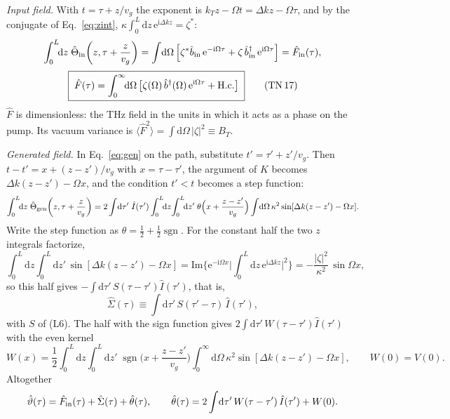 \documentclass[aps,pra,onecolumn,notitlepage,11pt,amsmath,amssymb,nofootinbib]{revtex4-2}
\newcommand{\Iop}{\hat I}
\newcommand{\dd}{\mathrm{d}}
\newcommand{\ee}{\mathrm{e}}
\newcommand{\ii}{\mathrm{i}}
\newcommand{\sgn}{\operatorname{sgn}}
\newcommand{\TN}[1]{\text{TN\,#1}}
\begin{document}
\emph{Input field.} With $t=\tau+z/v_g$ the exponent is
$k_Tz-\Omega t=\Delta kz-\Omega\tau$, and by the conjugate of
Eq.~\eqref{eq:zint}, $\kappa\int_0^L\dd z\,\ee^{\ii\Delta kz}=\zeta^*$:
\begin{equation}
\int_0^L\!\!\dd z\;\hat\Theta_{\rm in}\!\left(z,\tau+\frac{z}{v_g}\right)
=\int\!\dd\Omega\,\Big[\zeta^*\hat b_{\rm in}\,\ee^{-\ii\Omega\tau}+\zeta\,\hat b_{\rm in}^\dagger\,\ee^{\ii\Omega\tau}\Big]
=\hat F_{\rm in}(\tau),
\end{equation}
\begin{equation}
\boxed{\;\hat F(\tau)=\int_0^\infty\!\!\dd\Omega\,
\big[\zeta(\Omega)\,\hat b^\dagger(\Omega)\,\ee^{\ii\Omega\tau}+\mathrm{H.c.}\big]\;}
\tag{\TN{17}}
\end{equation}
$\hat F$ is dimensionless: the THz field in the units in which it acts as a
phase on the pump. Its vacuum variance is
$\langle\hat F^2\rangle=\int\dd\Omega\,|\zeta|^2\equiv B_T$.

\emph{Generated field.} In Eq.~\eqref{eq:gen} on the path, substitute
$t'=\tau'+z'/v_g$. Then $t-t'=x+(z-z')/v_g$ with $x=\tau-\tau'$, the argument
of $K$ becomes $\Delta k(z-z')-\Omega x$, and the condition $t'<t$ becomes a
step function:
\begin{equation}
\int_0^L\!\!\dd z\;\hat\Theta_{\rm gen}\!\left(z,\tau+\frac{z}{v_g}\right)
=2\int\!\dd\tau'\;\Iop(\tau')\int_0^L\!\!\dd z\!\int_0^L\!\!\dd z'\;
\theta\Big(x+\frac{z-z'}{v_g}\Big)\int\!\dd\Omega\,\kappa^2\sin[\Delta k(z-z')-\Omega x].
\end{equation}
Write the step function as $\theta=\tfrac12+\tfrac12\sgn$. For the constant
half the two $z$ integrals factorize,
\begin{equation}
\int_0^L\!\!\dd z\!\int_0^L\!\!\dd z'\,\sin[\Delta k(z-z')-\Omega x]
=\mathrm{Im}\Big\{\ee^{-\ii\Omega x}\Big|\int_0^L\!\!\dd z\,\ee^{\ii\Delta kz}\Big|^2\Big\}
=-\frac{|\zeta|^2}{\kappa^2}\,\sin\Omega x,
\end{equation}
so this half gives $-\int\dd\tau'\,S(\tau-\tau')\Iop(\tau')$, that is,
\begin{equation}
\hat\Sigma(\tau)\equiv\int\!\dd\tau'\,S(\tau'-\tau)\,\Iop(\tau'),
\end{equation}
with $S$ of (L6). The half with the sign function gives
$2\int\dd\tau'\,W(\tau-\tau')\Iop(\tau')$ with the even kernel
\begin{equation}
W(x)=\frac12\int_0^L\!\!\dd z\!\int_0^L\!\!\dd z'\;\sgn\Big(x+\frac{z-z'}{v_g}\Big)
\int_0^\infty\!\!\dd\Omega\,\kappa^2\sin[\Delta k(z-z')-\Omega x],\qquad W(0)=V(0).
\label{eq:W}
\end{equation}
Altogether
\begin{equation}
\hat\vartheta(\tau)=\hat F_{\rm in}(\tau)+\hat\Sigma(\tau)+\hat\theta(\tau),\qquad
\hat\theta(\tau)=2\int\!\dd\tau'\,W(\tau-\tau')\,\Iop(\tau')+W(0).
\label{eq:three}
\end{equation}
\end{document}
